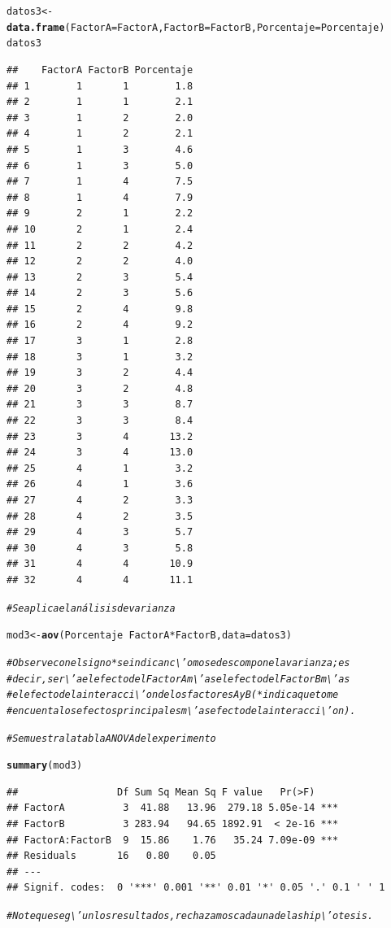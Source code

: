 \documentclass[12pt,letterpaper]{article}\usepackage[]{graphicx}\usepackage[]{color}
\makeatletter
\newcommand{\hlcom}[1]{\textcolor[rgb]{0.678,0.584,0.686}{\textit{#1}}}%
\newcommand{\hlopt}[1]{\textcolor[rgb]{0,0,0}{#1}}%
\newcommand{\hlstd}[1]{\textcolor[rgb]{0.345,0.345,0.345}{#1}}%
\newcommand{\hlkwb}[1]{\textcolor[rgb]{0.69,0.353,0.396}{#1}}%
\newcommand{\hlkwc}[1]{\textcolor[rgb]{0.333,0.667,0.333}{#1}}%
\newcommand{\hlkwd}[1]{\textcolor[rgb]{0.737,0.353,0.396}{\textbf{#1}}}%
\newenvironment{kframe}{%
 \def\at@end@of@kframe{}%
 \ifinner\ifhmode%
  \def\at@end@of@kframe{\end{minipage}}%
  \begin{minipage}{\columnwidth}%
 \fi\fi%
 \def\FrameCommand##1{\hskip\@totalleftmargin \hskip-\fboxsep
 \colorbox{shadecolor}{##1}\hskip-\fboxsep
     \hskip-\linewidth \hskip-\@totalleftmargin \hskip\columnwidth}%
 \MakeFramed {\advance\hsize-\width
   \@totalleftmargin\z@ \linewidth\hsize
   \@setminipage}}%
 {\par\unskip\endMakeFramed%
 \at@end@of@kframe}
\newenvironment{knitrout}{}{} %
\makeatother
\begin{document}
\begin{itemize}
\begin{knitrout}
\begin{kframe}
\begin{alltt}
\hlstd{datos3} \hlkwb{<-} \hlkwd{data.frame}\hlstd{(}\hlkwc{FactorA} \hlstd{= FactorA,} \hlkwc{FactorB} \hlstd{= FactorB,} \hlkwc{Porcentaje}\hlstd{=Porcentaje)}
\hlstd{datos3}
\end{alltt}
\begin{verbatim}
##    FactorA FactorB Porcentaje
## 1        1       1        1.8
## 2        1       1        2.1
## 3        1       2        2.0
## 4        1       2        2.1
## 5        1       3        4.6
## 6        1       3        5.0
## 7        1       4        7.5
## 8        1       4        7.9
## 9        2       1        2.2
## 10       2       1        2.4
## 11       2       2        4.2
## 12       2       2        4.0
## 13       2       3        5.4
## 14       2       3        5.6
## 15       2       4        9.8
## 16       2       4        9.2
## 17       3       1        2.8
## 18       3       1        3.2
## 19       3       2        4.4
## 20       3       2        4.8
## 21       3       3        8.7
## 22       3       3        8.4
## 23       3       4       13.2
## 24       3       4       13.0
## 25       4       1        3.2
## 26       4       1        3.6
## 27       4       2        3.3
## 28       4       2        3.5
## 29       4       3        5.7
## 30       4       3        5.8
## 31       4       4       10.9
## 32       4       4       11.1
\end{verbatim}
\begin{alltt}
\hlcom{# Se aplica el análisis de varianza }

\hlstd{mod3} \hlkwb{<-} \hlkwd{aov}\hlstd{(Porcentaje} \hlopt{~} \hlstd{FactorA} \hlopt{*} \hlstd{FactorB,} \hlkwc{data} \hlstd{= datos3)}

\hlcom{# Observe con el signo * se indican c\textbackslash{}'omo se descompone la varianza; es}
\hlcom{# decir, ser\textbackslash{}'a el efecto del Factor A m\textbackslash{}'as el efecto del Factor B m\textbackslash{}'as}
\hlcom{# el efecto de la interacci\textbackslash{}'on de los factores A y B (* indica que tome}
\hlcom{# en cuenta los efectos principales m\textbackslash{}'as efecto de la interacci\textbackslash{}'on).}

\hlcom{# Se muestra la tabla ANOVA del experimento }

\hlkwd{summary}\hlstd{(mod3)}
\end{alltt}
\begin{verbatim}
##                 Df Sum Sq Mean Sq F value   Pr(>F)    
## FactorA          3  41.88   13.96  279.18 5.05e-14 ***
## FactorB          3 283.94   94.65 1892.91  < 2e-16 ***
## FactorA:FactorB  9  15.86    1.76   35.24 7.09e-09 ***
## Residuals       16   0.80    0.05                     
## ---
## Signif. codes:  0 '***' 0.001 '**' 0.01 '*' 0.05 '.' 0.1 ' ' 1
\end{verbatim}
\begin{alltt}
\hlcom{# Note que seg\textbackslash{}'un los resultados, rechazamos cada una de las hip\textbackslash{}'otesis. }
\end{alltt}
\end{kframe}
\end{knitrout}



\end{itemize}
\end{document}
